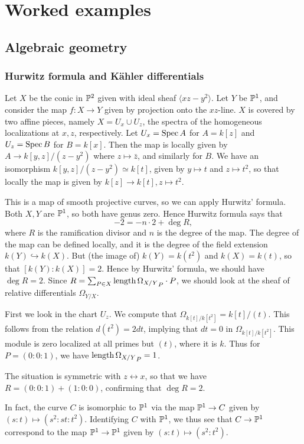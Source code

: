 \documentclass[11pt, english]{article}
\begin{document}
\section{Worked examples}
\subsection{Algebraic geometry}

\subsubsection{Hurwitz formula and Kähler differentials}
\label{exhurwitz}

Let $X$ be the conic in $\mathbb{P}^2$ given with ideal sheaf $\langle xz-y^2 \rangle$. Let $Y$ be $\mathbb{P}^1$, and consider the map $f:X \to Y$ given by projection onto the $xz$-line. $X$ is covered by two affine pieces, namely $X= U_x \cup U_z$, the spectra of the homogeneous localizations at $x,z$, respectively. Let $U_x=\operatorname{Spec} A$ for $A=k[z]$ and $U_z = \operatorname{Spec} B$ for $B=k[x]$. Then the map is locally given by $A \to k[y,z]/(z-y^2)$ where $z \mapsto \bar z$, and similarly for $B$. We have an isomorphism $k[y,z]/(z-y^2) \simeq k[t]$, given by $y \mapsto t$ and $z \mapsto t^2$, so that locally the map is given by $k[z] \to k[t], z \mapsto t^2$.

This is a map of smooth projective curves, so we can apply Hurwitz' formula. Both $X,Y$ are $\mathbb{P}^1$, so both have genus zero. Hence Hurwitz formula says that
\[
-2 = -n \cdot 2+ \deg R,
\]
where $R$ is the ramification divisor and $n$ is the degree of the map. The degree of the map can be defined locally, and it is the degree of the field extension $k(Y) \hookrightarrow k(X)$. But (the image of) $k(Y) = k(t^2)$ and $k(X)=k(t)$, so that $[k(Y):k(X)]=2$. Hence by Hurwitz' formula, we should have $\deg R = 2$. Since $R = \sum_{P \in X} \mathrm{length} \, {\Omega_{X/Y}}_P \cdot P$, we should look at the sheaf of relative differentials $\Omega_{Y/X}$.

First we look in the chart $U_z$. We compute that $\Omega_{k[t]/k[t^2]} = k[t]/(t)$. This follows from the relation $d(t^2)=2dt$, implying that $dt=0$ in $\Omega_{k[t]/k[t^2]}$. This module is zero localized at all primes but $(t)$, where it is $k$. Thus for $P=(0:0:1)$, we have $\mathrm{length} \, {\Omega_{X/Y}}_P = 1$.

The situation is symmetric with $z \leftrightarrow x$, so that we have $R = (0:0:1) + (1:0:0)$, confirming that $\deg R=2$. 

In fact, the curve $C$ is isomorphic to $\mathbb{P}^1$ via the map $\mathbb{P}^1 \to C$ given by $(s:t) \mapsto (s^2:st:t^2)$. Identifying $C$ with $\mathbb{P}^1$, we thus see that $C \to \mathbb{P}^1$ correspond to the map $\mathbb{P}^1 \to \mathbb{P}^1$ given by $(s:t) \mapsto (s^2:t^2)$. 
\end{document}
